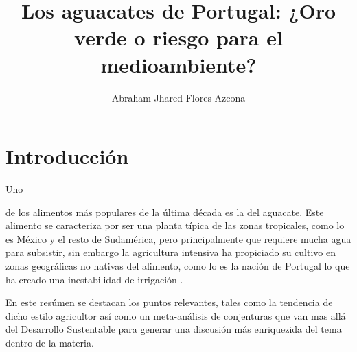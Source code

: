 \documentclass[stu, 12pt, letterpaper, donotrepeattitle, floatsintext, natbib]{apa7}
\title{\Large Los aguacates de Portugal: ¿Oro verde o riesgo para el medioambiente?}
\author{Abraham Jhared Flores Azcona} %
\affiliation{Instituto Tecnológico de Tijuana}
\begin{document}
\maketitle


\renewcommand\contentsname{Contenido}
\tableofcontents

\newpage
\section{Introducción}
Uno \begin{justifying}
de los alimentos más populares de la última década es la del aguacate. Este alimento se caracteriza por ser una planta típica de las zonas tropicales, como lo es México
y el resto de Sudamérica, pero principalmente que requiere mucha agua para subsistir, sin embargo la agricultura intensiva ha propiciado su cultivo en  zonas
geográficas no nativas del alimento, como lo es la nación de Portugal lo que ha creado una inestabilidad de irrigación \citep{dw-2021}.\par
\vspace{\baselineskip}
En este resúmen se destacan los puntos relevantes, tales como la tendencia de dicho estilo agricultor así como un meta-análisis de conjenturas que van mas allá del Desarrollo 
Sustentable para generar una discusión más enriquezida del tema dentro de la materia.\par
\vspace{\baselineskip}
\end{justifying}
\end{document}

